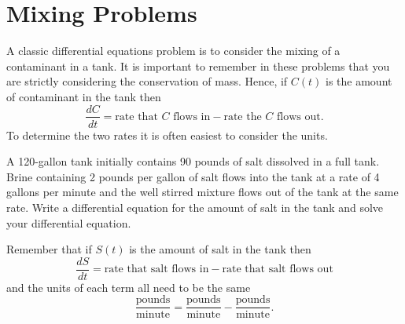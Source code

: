 \newpage\section{Mixing Problems}
A classic differential equations problem is to consider the mixing of a contaminant in a
tank.  It is important to remember in these problems that you are strictly considering the
conservation of mass.  Hence, if $C(t)$ is the amount of contaminant in the tank then
\[ \frac{dC}{dt} = \text{rate that $C$ flows in} - \text{rate the $C$ flows out}. \]
To determine the two rates it is often easiest to consider the units.
\begin{problem}
    A 120-gallon tank initially contains 90 pounds of salt dissolved in a full tank.
    Brine containing 2 pounds per gallon of salt flows into the tank at a rate of 4
    gallons per minute and the well stirred mixture flows out of the tank at the same
    rate.  Write a differential equation for the amount of salt in the tank and solve your
    differential equation.

    Remember that if $S(t)$ is the amount of salt in the tank then
    \[ \frac{dS}{dt} = \text{rate that salt flows in} - \text{rate that salt flows out} \]
    and the units of each term all need to be the same
    \[ \frac{\text{pounds}}{\text{minute}} = \frac{\text{pounds}}{\text{minute}} -
        \frac{\text{pounds}}{\text{minute}}. \]
\end{problem}
\solution{
    \[ \frac{dS}{dt} = 4(2) - \frac{4S}{120} \quad \text{with} \quad S(0) = 90. \]
    \[ \frac{dS}{dt} = -\frac{4}{120} \left( S - 8\left( \frac{120}{4} \right) \right) \]
    \[ S(t) = -150 e^{-4t/120} + 240 \]
}

